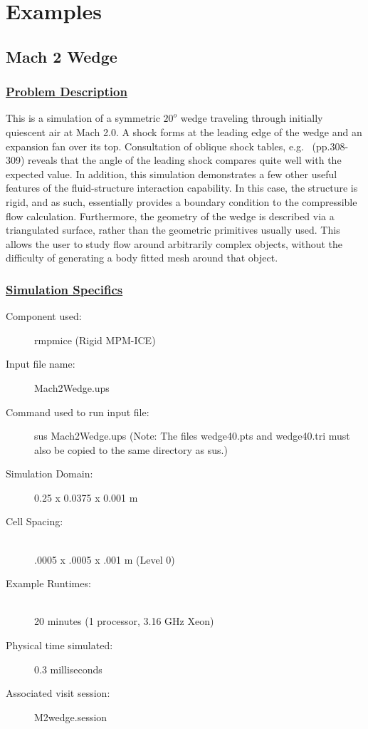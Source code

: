 \newpage

\section{Examples} \label {Sec:MPMICE_EXAMPLES}

\subsection*{\center Mach 2 Wedge}
\subsubsection*{\underline{Problem Description}}
This is a simulation of a symmetric $20^o$ wedge traveling through initially
quiescent air at Mach 2.0.  A shock forms at the leading edge of the
wedge and an expansion fan over its top.  Consultation of oblique shock
tables, e.g.~\cite{ref:Saad} (pp.308-309) reveals that the angle of the leading
shock compares quite well with the expected value.  In addition, this
simulation demonstrates a few other useful features of the fluid-structure
interaction capability.  In this case, the structure is rigid, and as
such, essentially provides a boundary condition to the compressible flow
calculation.  Furthermore, the geometry of the wedge is described via a
triangulated surface, rather than the geometric primitives usually used.
This allows the user to study flow around arbitrarily complex objects,
without the difficulty of generating a body fitted mesh around that object.

\subsubsection*{\underline{Simulation Specifics}}
\begin{description}
\item [Component used:] \hfill rmpmice (Rigid MPM-ICE)
\item [Input file name:] \hfill Mach2Wedge.ups
\item [Command used to run input file:]\hfill sus Mach2Wedge.ups
(Note: The files wedge40.pts and wedge40.tri must also be copied to
the same directory as sus.)

\item [Simulation Domain:]\hfill    0.25 x 0.0375 x 0.001 m

\item [Cell Spacing:]\hfill \\
.0005 x .0005 x .001 m (Level 0)

\item [Example Runtimes:] \hfill \\
 20 minutes   (1 processor, 3.16 GHz Xeon)\\

\item [Physical time simulated:] \hfill 0.3 milliseconds

\item [Associated visit session:] \hfill M2wedge.session

\end{description}

